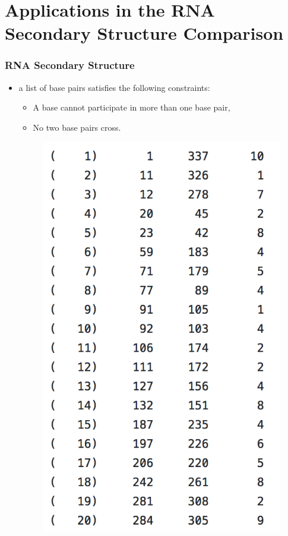 \documentclass{beamer}
\begin{document}
\section{Applications in the RNA Secondary Structure Comparison}
\begin{frame}
\frametitle{RNA Secondary Structure}
\begin{itemize}
\item a list of base pairs satisfies the following constraints:
\begin{itemize}
\item A base cannot participate in more than one base pair,
\item No two base pairs cross.
\end{itemize}
\begin{figure}
	\includegraphics[width=0.35\linewidth]{BasePairs}
	\centering
\end{figure}
\end{itemize}
\end{frame}
\end{document}
